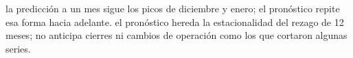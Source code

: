 {la predicción a un mes sigue los picos de diciembre y enero; el pronóstico repite esa forma hacia adelante.}
{el pronóstico hereda la estacionalidad del rezago de 12 meses; no anticipa cierres ni cambios de operación como los que cortaron algunas series.}
